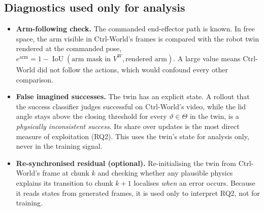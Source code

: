 \documentclass[11pt,a4paper]{article}
\theoremstyle{plain}
\theoremstyle{definition}
\theoremstyle{remark}
\newcommand{\VW}{V^{W}}
\DeclareMathOperator{\IoU}{IoU}
\begin{document}
\subsection{Diagnostics used only for analysis}\label{sec:diag}
\begin{itemize}
\item \textbf{Arm-following check.} The commanded end-effector path is known. In free space, the arm visible in Ctrl-World's frames is compared with the robot twin rendered at the commanded pose, $e^{\mathrm{arm}}=1-\IoU(\text{arm mask in }\VW,\text{rendered arm})$. A large value means Ctrl-World did not follow the actions, which would confound every other comparison.
\item \textbf{False imagined successes.} The twin has an explicit state. A rollout that the success classifier judges successful on Ctrl-World's video, while the lid angle stays above the closing threshold for every $\vartheta\in\Theta$ in the twin, is a \emph{physically inconsistent success}. Its share over updates is the most direct measure of exploitation (RQ2). This uses the twin's state for analysis only, never in the training signal.
\item \textbf{Re-synchronised residual (optional).} Re-initialising the twin from Ctrl-World's frame at chunk $k$ and checking whether any plausible physics explains its transition to chunk $k+1$ localises \emph{when} an error occurs. Because it reads states from generated frames, it is used only to interpret RQ2, not for training.
\end{itemize}

\renewcommand{\thesubsection}{\thesection.\arabic{subsection}}
\renewcommand{\thesubsubsection}{\thesubsection.\arabic{subsubsection}}
\end{document}
